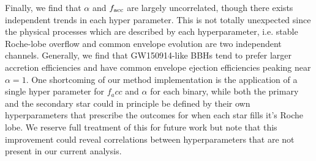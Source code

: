 \documentclass[twocolumn]{aastex631}
\newcommand{\kw}[1]{{\color{rb4}[KW: #1 ]}}
\newcommand{\kb}[1]{\textcolor{pink}{#1}}
\begin{document}
Finally, we find that $\alpha$ and $f_{\rm acc}$ are largely uncorrelated, though there exists independent trends in each hyper parameter.
This is not totally unexpected since the physical processes which are described by each hyperparameter, i.e. stable Roche-lobe overflow and 
common envelope evolution are two independent channels. Generally, we find that GW150914-like BBHs tend to prefer larger accretion efficiencies 
and have common envelope ejection efficiencies peaking near $\alpha=1$. One shortcoming of our method implementation is the application of a single 
hyper parameter for $f_acc$ and $\alpha$ for each binary, while both the primary and the secondary star could in principle be defined by their own 
hyperparameters that prescribe the outcomes for when each star fills it's Roche lobe. We reserve full treatment of this for future work but note 
that this improvement could reveal correlations between hyperparameters that are not present in our current analysis.
\end{document}

